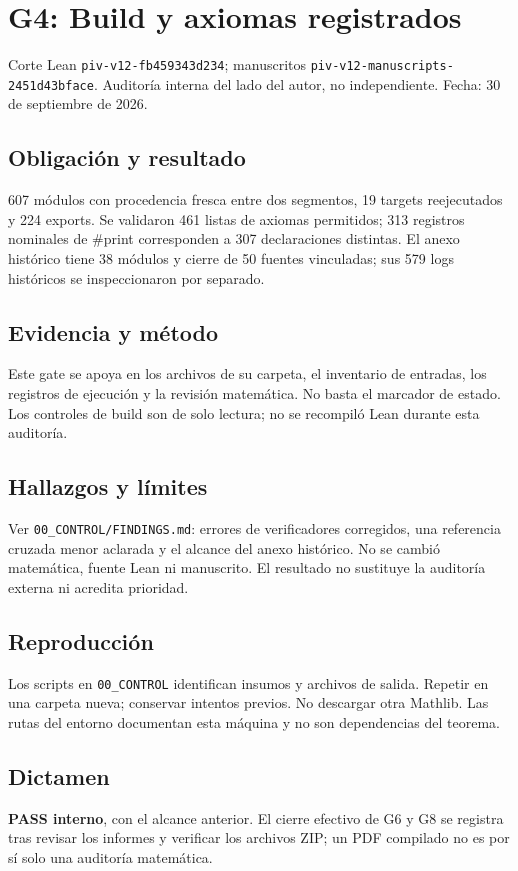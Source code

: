 \documentclass[11pt]{article}
\begin{document}
\section{G4: Build y axiomas
registrados}\label{g4-build-y-axiomas-registrados}

Corte Lean \nolinkurl{piv-v12-fb459343d234}; manuscritos
\nolinkurl{piv-v12-manuscripts-2451d43bface}. Auditoría interna del lado
del autor, no independiente. Fecha: 30 de septiembre de 2026.

\subsection{Obligación y resultado}\label{obligaciuxf3n-y-resultado}

607 módulos con procedencia fresca entre dos segmentos, 19 targets
reejecutados y 224 exports. Se validaron 461 listas de axiomas
permitidos; 313 registros nominales de \#print corresponden a 307
declaraciones distintas. El anexo histórico tiene 38 módulos y cierre de
50 fuentes vinculadas; sus 579 logs históricos se inspeccionaron por
separado.

\subsection{Evidencia y método}\label{evidencia-y-muxe9todo}

Este gate se apoya en los archivos de su carpeta, el inventario de
entradas, los registros de ejecución y la revisión matemática. No basta
el marcador de estado. Los controles de build son de solo lectura; no se
recompiló Lean durante esta auditoría.

\subsection{Hallazgos y límites}\label{hallazgos-y-luxedmites}

Ver \nolinkurl{00_CONTROL/FINDINGS.md}: errores de verificadores
corregidos, una referencia cruzada menor aclarada y el alcance del anexo
histórico. No se cambió matemática, fuente Lean ni manuscrito. El
resultado no sustituye la auditoría externa ni acredita prioridad.

\subsection{Reproducción}\label{reproducciuxf3n}

Los scripts en \nolinkurl{00_CONTROL} identifican insumos y archivos de
salida. Repetir en una carpeta nueva; conservar intentos previos. No
descargar otra Mathlib. Las rutas del entorno documentan esta máquina y
no son dependencias del teorema.

\subsection{Dictamen}\label{dictamen}

\textbf{PASS interno}, con el alcance anterior. El cierre efectivo de G6
y G8 se registra tras revisar los informes y verificar los archivos ZIP;
un PDF compilado no es por sí solo una auditoría matemática.
\end{document}
